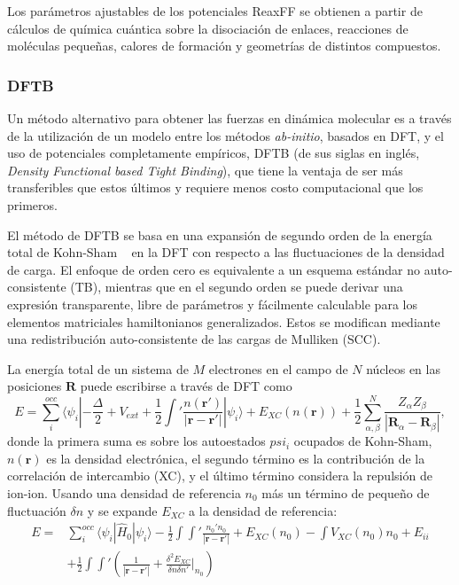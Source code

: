Los parámetros ajustables de los potenciales ReaxFF se obtienen a partir de 
cálculos de química cuántica sobre la disociación de enlaces, reacciones de 
moléculas pequeñas, calores de formación y geometrías de distintos compuestos.

\subsubsection{DFTB}

Un método alternativo para obtener las fuerzas en dinámica molecular es a través
de la utilización de un modelo  entre los métodos \textit{ab-initio},
basados en DFT, y el uso de potenciales completamente empíricos, DFTB (de sus 
siglas en inglés, \textit{Density Functional based Tight Binding}), que tiene
la ventaja de ser más transferibles que estos últimos y requiere menos costo
computacional que los primeros.

El método de DFTB se basa en una expansión de segundo orden de la energía total 
de Kohn-Sham ~\cite{dft1, dft2} en la DFT con respecto a las fluctuaciones de la 
densidad de carga. El enfoque de orden cero es equivalente a un esquema estándar 
no auto-consistente (TB), mientras que en el segundo orden se puede derivar una 
expresión transparente, libre de parámetros y fácilmente calculable para los 
elementos matriciales hamiltonianos generalizados. Estos se modifican mediante 
una redistribución auto-consistente de las cargas de Mulliken (SCC).

La energía total de un sistema de $M$ electrones en el campo de $N$ núcleos en
las posiciones $\mathbf{R}$ puede escribirse a través de DFT como
$$
E = \sum_i^{occ} \langle \psi_i | - \frac{\Delta}{2} + V_{ext} + \frac{1}{2} \int' \frac{n(\mathbf{r}')}{|\mathbf{r} - \mathbf{r}'|} | \psi_i \rangle + E_{XC}(n(\mathbf{r})) + \frac{1}{2} \sum_{\alpha, \beta}^N \frac{Z_{\alpha}Z_{\beta}}{|\mathbf{R}_{\alpha} - \mathbf{R}_{\beta}|},
$$
donde la primera suma es sobre los autoestados $psi_i$ ocupados de Kohn-Sham,
$n(\mathbf{r})$ es la densidad electrónica, el segundo término es la contribución
de la correlación de intercambio (XC), y el último término considera la repulsión
de ion-ion. Usando una densidad de referencia $n_0$ más un término de pequeño de
fluctuación $\delta n$ y se expande $E_{XC}$ a la densidad de referencia:
\begin{equation}\label{eq:dft-fluc}
    \begin{aligned}
        E =& \sum_i^{occ} \langle \psi_i | \hat{H}_0 | \psi_i \rangle - \frac{1}{2} \int \int' \frac{n_0' n_0}{|\mathbf{r} - \mathbf{r}'|} + E_{XC}(n_0) - \int V_{XC}(n_0)n_0 + E_{ii} \\
        &+ \frac{1}{2} \int \int' \left(\frac{1}{|\mathbf{r} - \mathbf{r}'|} + \frac{\delta^2 E_{XC}}{\delta n \delta n'}\bigg\rvert_{n_0} \right)
    \end{aligned}
\end{equation}

